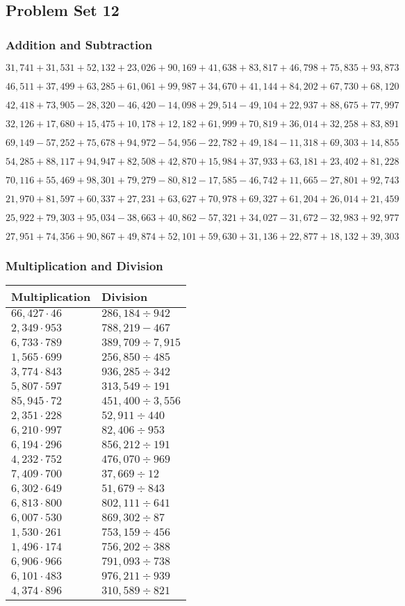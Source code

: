 \hypertarget{problem-set-12-4}{%
\subsection{Problem Set 12}\label{problem-set-12-4}}

\hypertarget{addition-and-subtraction-234}{%
\subsubsection{Addition and
Subtraction}\label{addition-and-subtraction-234}}

\(31,741+31,531+52,132+23,026+90,169+41,638+83,817+46,798+75,835+ 93,873\)

\(46,511+37,499+63,285+61,061+99,987+34,670+41,144+84,202+67,730+68,120\)

\(42,418+73,905-28,320-46,420-14,098+29,514-49,104+22,937+88,675+77,997\)

\(32,126+17,680+15,475+10,178+12,182+61,999+70,819+36,014+32,258+83,891\)

\(69,149-57,252+75,678+94,972-54,956-22,782+49,184-11,318+69,303+14,855\)

\(54,285+88,117+94,947+82,508+42,870+15,984+37,933+63,181+23,402+81,228\)

\(70,116+55,469+98,301+79,279-80,812-17,585-46,742+11,665-27,801+92,743\)

\(21,970+81,597+60,337+27,231+63,627+70,978+69,327+61,204+26,014+21,459\)

\(25,922+79,303+95,034-38,663+40,862-57,321+34,027-31,672-32,983+92,977\)

\(27,951+74,356+90,867+49,874+52,101+59,630+31,136+22,877+18,132+39,303\)

\hypertarget{multiplication-and-division-233}{%
\subsubsection{Multiplication and
Division}\label{multiplication-and-division-233}}

\begin{longtable}[]{@{}ll@{}}
\toprule
Multiplication & Division\tabularnewline
\midrule
\endhead
\(66,427\cdot46\) & \(286,184÷942\)\tabularnewline
\(2,349\cdot953\) & \(788,219- 467\)\tabularnewline
\(6,733\cdot789\) & \(389,709÷7,915\)\tabularnewline
\(1,565\cdot699\) & \(256,850÷485\)\tabularnewline
\(3,774\cdot843\) & \(936,285÷342\)\tabularnewline
\(5,807\cdot597\) & \(313,549÷191\)\tabularnewline
\(85,945\cdot72\) & \(451,400÷3,556\)\tabularnewline
\(2,351\cdot228\) & \(52,911÷440\)\tabularnewline
\(6,210\cdot997\) & \(82,406÷953\)\tabularnewline
\(6,194\cdot296\) & \(856,212÷191\)\tabularnewline
\(4,232\cdot752\) & \(476,070÷969\)\tabularnewline
\(7,409\cdot700\) & \(37,669÷12\)\tabularnewline
\(6,302\cdot649\) & \(51,679÷843\)\tabularnewline
\(6,813\cdot800\) & \(802,111÷641\)\tabularnewline
\(6,007\cdot530\) & \(869,302÷87\)\tabularnewline
\(1,530\cdot261\) & \(753,159÷456\)\tabularnewline
\(1,496\cdot174\) & \(756,202÷388\)\tabularnewline
\(6,906\cdot966\) & \(791,093÷738\)\tabularnewline
\(6,101\cdot483\) & \(976,211÷939\)\tabularnewline
\(4,374\cdot896\) & \(310,589÷821\)\tabularnewline
\bottomrule
\end{longtable}

